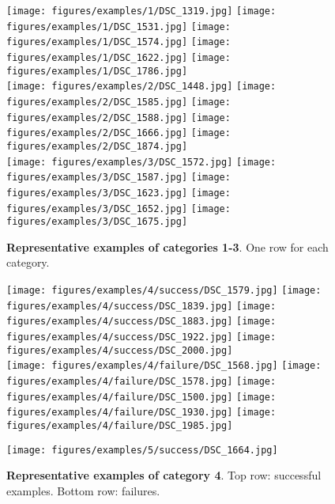\documentclass[10pt,twocolumn,letterpaper]{article}
\begin{document}
\begin{figure}
\centering
\texttt{[image: figures/examples/1/DSC\_1319.jpg]} 
\texttt{[image: figures/examples/1/DSC\_1531.jpg]} 
\texttt{[image: figures/examples/1/DSC\_1574.jpg]} 
\texttt{[image: figures/examples/1/DSC\_1622.jpg]} 
\texttt{[image: figures/examples/1/DSC\_1786.jpg]} \\
\texttt{[image: figures/examples/2/DSC\_1448.jpg]} 
\texttt{[image: figures/examples/2/DSC\_1585.jpg]} 
\texttt{[image: figures/examples/2/DSC\_1588.jpg]} 
\texttt{[image: figures/examples/2/DSC\_1666.jpg]} 
\texttt{[image: figures/examples/2/DSC\_1874.jpg]} \\
\texttt{[image: figures/examples/3/DSC\_1572.jpg]} 
\texttt{[image: figures/examples/3/DSC\_1587.jpg]} 
\texttt{[image: figures/examples/3/DSC\_1623.jpg]} 
\texttt{[image: figures/examples/3/DSC\_1652.jpg]} 
\texttt{[image: figures/examples/3/DSC\_1675.jpg]} 
 \caption{{\bf Representative examples of categories 1-3}. One row for each category.\vspace{1.0mm}}\label{fig:examples1-3}
\centering
\texttt{[image: figures/examples/4/success/DSC\_1579.jpg]} 
\texttt{[image: figures/examples/4/success/DSC\_1839.jpg]} 
\texttt{[image: figures/examples/4/success/DSC\_1883.jpg]} 
\texttt{[image: figures/examples/4/success/DSC\_1922.jpg]} 
\texttt{[image: figures/examples/4/success/DSC\_2000.jpg]} \\
\texttt{[image: figures/examples/4/failure/DSC\_1568.jpg]} 
\texttt{[image: figures/examples/4/failure/DSC\_1578.jpg]} 
\texttt{[image: figures/examples/4/failure/DSC\_1500.jpg]} 
\texttt{[image: figures/examples/4/failure/DSC\_1930.jpg]} 
\texttt{[image: figures/examples/4/failure/DSC\_1985.jpg]} 
 \caption{{\bf Representative examples of category 4}. Top row: successful examples. Bottom row: failures.}\label{fig:examples4}
\vspace{1mm}
\centering
\texttt{[image: figures/examples/5/success/DSC\_1664.jpg]} 

\end{figure}
\end{document}
